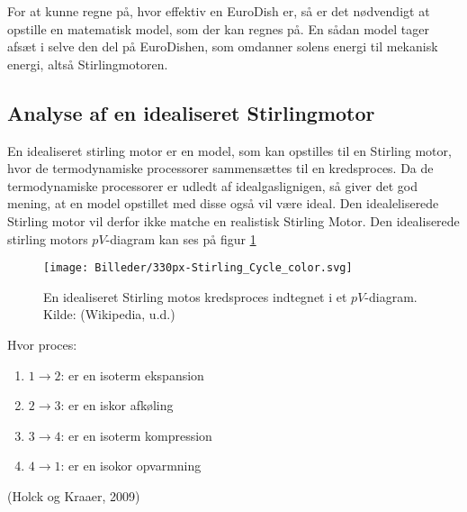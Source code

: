 \documentclass[SRC.tex]{subfiles}
\begin{document}
	
	For at kunne regne på, hvor effektiv en EuroDish er, så er det nødvendigt at opstille
	en matematisk model, som der kan regnes på. En sådan model tager afsæt i selve den del
	på EuroDishen, som omdanner solens energi til mekanisk energi, altså Stirlingmotoren. 
	
	\subsection{Analyse af en idealiseret Stirlingmotor}
	En idealiseret stirling motor er en model, som kan opstilles til en 
	Stirling motor, hvor de termodynamiske processorer sammensættes til en kredsproces. Da 
	de termodynamiske processorer er udledt af idealgaslignigen, så giver det 
	god mening, at en model opstillet med disse også vil være ideal. Den idealeliserede Stirling motor vil derfor ikke matche en realistisk Stirling Motor. Den idealiserede stirling motors \(pV\)-diagram kan ses på figur \ref{fig:stirlingcycle}
	
	\begin{figure}[h!]
		\centering
		\texttt{[image: Billeder/330px-Stirling\_Cycle\_color.svg]}
		\caption{En idealiseret Stirling motos kredsproces indtegnet i et \(pV\)-diagram. Kilde: (Wikipedia, u.d.) }
		\label{fig:stirlingcycle}
	\end{figure}
	

	Hvor proces:
	\begin{enumerate}[]
		\item \quad \(1 \rightarrow 2\): er en isoterm ekspansion
		\item \quad \(2 \rightarrow 3\): er en iskor afkøling
		\item \quad \(3 \rightarrow 4\): er en isoterm kompression
		\item \quad \(4 \rightarrow 1\): er en isokor opvarmning
	\end{enumerate}
	(Holck og Kraaer, 2009)
	
	
\end{document}
